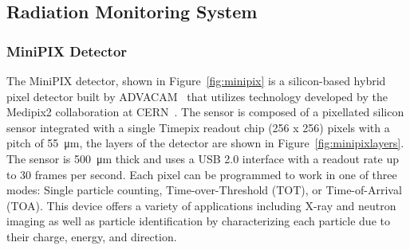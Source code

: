 \subsection{Radiation Monitoring System}
\label{sec:Radiation Design}
\subsubsection{MiniPIX Detector}
The MiniPIX detector, shown in Figure~\ref{fig:minipix} is a silicon-based hybrid pixel detector built by ADVACAM~\cite{advacam} that utilizes technology developed by the Medipix2 collaboration at CERN~\cite{medipix}. The sensor is composed of a pixellated silicon sensor integrated with a single Timepix readout chip (256 x 256) pixels with a pitch of \SI{55}{\micro\meter}, the layers of the detector are shown in Figure~\ref{fig:minipixlayers}. The sensor is \SI{500}{\micro\meter} thick and uses a USB 2.0 interface with a readout rate up to 30 frames per second. Each pixel can be programmed to work in one of three modes: Single particle counting, Time-over-Threshold (TOT), or Time-of-Arrival (TOA). This device offers a variety of applications including X-ray and neutron imaging as well as particle identification by characterizing each particle due to their charge, energy, and direction.

